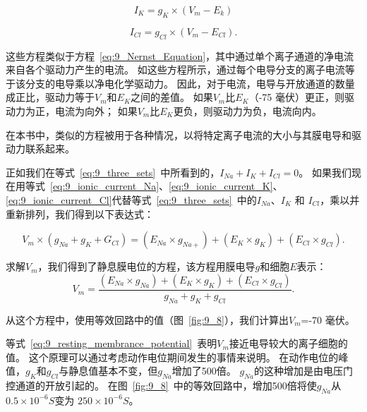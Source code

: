 \begin{proposition}[利用等效回路模型计算静息膜电位]
	\begin{equation}\label{eq:9_ionic_current_K}
		I_K = g_K \times (V_m - E_k)
	\end{equation}

	\begin{equation}\label{eq:9_ionic_current_Cl}
		I_{Cl} = g_{Cl} \times (V_m - E_{Cl}).
	\end{equation}
	
	\quad \quad 这些方程类似于方程~\ref{eq:9_Nernst_Equation}，其中通过单个离子通道的净电流来自各个驱动力产生的电流。
	如这些方程所示，通过每个电导分支的离子电流等于该分支的电导乘以净电化学驱动力。
	因此，对于电流，电导与开放通道的数量成正比，驱动力等于$V_m$和$E_K$之间的差值。
	如果$V_m$比$E_K$（-75 毫伏）更正，则驱动力为正，电流为向外；
	如果$V_m$比$E_K$更负，则驱动力为负，电流向内。
	
	\quad \quad 在本书中，类似的方程被用于各种情况，以将特定离子电流的大小与其膜电导和驱动力联系起来。
	
	\quad \quad 正如我们在等式~\ref{eq:9_three_sets}~中所看到的，$ I_{Na} + I_{K} + I_{Cl} = 0 $。
	如果我们现在用等式~\ref{eq:9_ionic_current_Na}、\ref{eq:9_ionic_current_K}、\ref{eq:9_ionic_current_Cl}代替等式~\ref{eq:9_three_sets}~中的$ I_{Na} $、$ I_{K} $ 和 $ I_{Cl} $，乘以并重新排列，我们得到以下表达式：
	
	\begin{equation}\label{eq:9_rearrange_three}
		V_m \times (g_{Na} + g_K + G_{Cl}) = 
		(E_{Na} \times g_{Na+}) + (E_K \times g_K) + (E_{Cl} \times g_{Cl}).
	\end{equation}
	
	\quad \quad 求解$V_m$，我们得到了静息膜电位的方程，该方程用膜电导$ g $和细胞$ E $表示：
	\begin{equation}\label{eq:9_resting_membrance_potential}
		V_m = 
		\frac{
			(E_{Na} \times g_{Na}) + 
			(E_K \times g_K) + 
			(E_{Cl} \times g_{Cl})
		}
		{
			g_{Na} + g_{K} + g_{Cl}
		}.
	\end{equation}
	
	\quad \quad 从这个方程中，使用等效回路中的值（图~\ref{fig:9_8}），我们计算出$V_m$=-70 毫伏。
	
	\quad \quad 等式~\ref{eq:9_resting_membrance_potential}~表明$V_m$接近电导较大的离子细胞的值。
	这个原理可以通过考虑动作电位期间发生的事情来说明。
	在动作电位的峰值，$ g_K $和$ g_{Cl} $与静息值基本不变，但$ g_{Na} $增加了500倍。
	$ g_{Na} $的这种增加是由电压门控通道的开放引起的。
	在图~\ref{fig:9_8}~中的等效回路中，增加500倍将使$ g_{Na} $从 $ 0.5\times 10^{-6} S$变为 $ 250 \times 10^{-6} S $。
	

\end{proposition}

